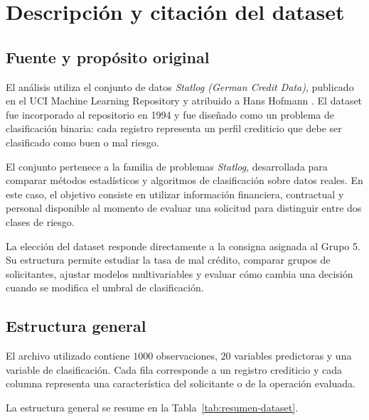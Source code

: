 \section{Descripción y citación del dataset}
\label{sec:dataset}

\subsection{Fuente y propósito original}

El análisis utiliza el conjunto de datos
\textit{Statlog (German Credit Data)}, publicado en el
UCI Machine Learning Repository y atribuido a Hans Hofmann
\parencite{hofmann1994statlog}. El dataset fue incorporado al repositorio
en 1994 y fue diseñado como un problema de clasificación binaria: cada
registro representa un perfil crediticio que debe ser clasificado como
buen o mal riesgo.

El conjunto pertenece a la familia de problemas \textit{Statlog},
desarrollada para comparar métodos estadísticos y algoritmos de
clasificación sobre datos reales. En este caso, el objetivo consiste en
utilizar información financiera, contractual y personal disponible al
momento de evaluar una solicitud para distinguir entre dos clases de
riesgo.

La elección del dataset responde directamente a la consigna asignada al
Grupo 5. Su estructura permite estudiar la tasa de mal crédito, comparar
grupos de solicitantes, ajustar modelos multivariables y evaluar cómo
cambia una decisión cuando se modifica el umbral de clasificación.

\subsection{Estructura general}

El archivo utilizado contiene \(1000\) observaciones, \(20\) variables
predictoras y una variable de clasificación. Cada fila corresponde a un
registro crediticio y cada columna representa una característica del
solicitante o de la operación evaluada.

La estructura general se resume en la
Tabla~\ref{tab:resumen-dataset}.

